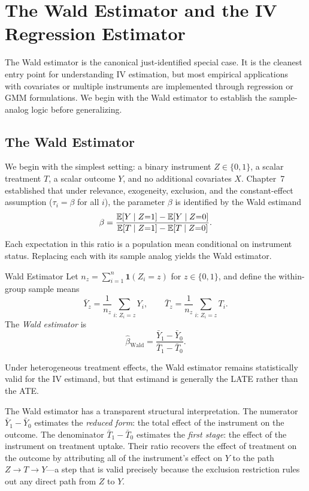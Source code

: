 \documentclass[master.tex]{subfiles}
\begin{document}
\section{The Wald Estimator and the IV Regression Estimator}
\label{w12:sec:wald}

The Wald estimator is the canonical just-identified special case.
It is the cleanest entry point for understanding IV estimation, but
most empirical applications with covariates or multiple instruments
are implemented through regression or GMM formulations.  We begin
with the Wald estimator to establish the sample-analog logic before
generalizing.

\subsection{The Wald Estimator}

We begin with the simplest setting: a binary instrument
$Z \in \{0,1\}$, a scalar treatment $T$, a scalar outcome $Y$, and
no additional covariates $X$.  Chapter~7 established that under
relevance, exogeneity, exclusion, and the constant-effect assumption
($\tau_i = \beta$ for all $i$), the parameter $\beta$ is
identified by the Wald estimand
\[
  \beta
  = \frac{\mathbb{E}[Y \mid Z{=}1] - \mathbb{E}[Y \mid Z{=}0]}
         {\mathbb{E}[T \mid Z{=}1] - \mathbb{E}[T \mid Z{=}0]}.
\]
Each expectation in this ratio is a population mean conditional on
instrument status.  Replacing each with its sample analog yields the
Wald estimator.

\begin{defn}{Wald Estimator}
\label{w12:defn:wald}
Let $n_z = \sum_{i=1}^n \mathbf{1}(Z_i = z)$ for $z \in \{0,1\}$,
and define the within-group sample means
\[
  \bar{Y}_z
  = \frac{1}{n_z}\sum_{i:\,Z_i=z} Y_i,
  \qquad
  \bar{T}_z
  = \frac{1}{n_z}\sum_{i:\,Z_i=z} T_i.
\]
The \emph{Wald estimator} is
\begin{equation}
  \hat\beta_{\mathrm{Wald}}
  = \frac{\bar{Y}_1 - \bar{Y}_0}{\bar{T}_1 - \bar{T}_0}.
  \label{w12:eq:wald-est}
\end{equation}
\end{defn}

Under heterogeneous treatment effects, the Wald estimator remains
statistically valid for the IV estimand, but that estimand is
generally the LATE rather than the ATE.

The Wald estimator has a transparent structural interpretation.
The numerator $\bar{Y}_1 - \bar{Y}_0$ estimates the \emph{reduced
form}: the total effect of the instrument on the outcome.  The
denominator $\bar{T}_1 - \bar{T}_0$ estimates the \emph{first stage}:
the effect of the instrument on treatment uptake.  Their ratio
recovers the effect of treatment on the outcome by attributing all
of the instrument's effect on $Y$ to the path $Z \to T \to Y$---a
step that is valid precisely because the exclusion restriction rules
out any direct path from $Z$ to $Y$.
\end{document}
